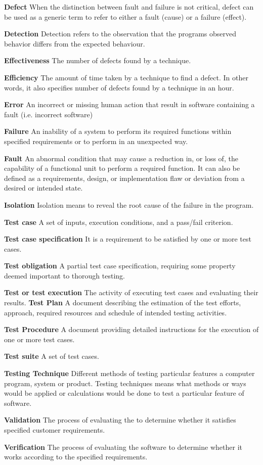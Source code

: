 \begin{glossary1}

\textbf{Defect} When the distinction between fault and failure is not critical, defect can be used as a generic term to refer to either a fault (cause) or a failure (effect).

\textbf{Detection} Detection refers to the observation that the programs observed behavior differs from the expected behaviour.

\textbf{Effectiveness} The number of defects found by a technique.

\textbf{Efficiency} The amount of time taken by a technique to find a defect. In other words, it also specifies number of defects found by a technique in an hour.

\textbf{Error} An incorrect or missing human action that result in software containing a fault (i.e. incorrect software)

\textbf{Failure} An inability of a system to perform its required functions within specified requirements or to perform in an unexpected way.

\textbf{Fault} An abnormal condition that may cause a reduction in, or loss of, the capability of a functional unit to perform a required function. It can also be defined as a requirements, design, or implementation flaw or deviation from a desired or intended state.

\textbf{Isolation} Isolation means to reveal the root cause of the failure in the program.

\textbf{Test case} A set of inputs, execution conditions, and a pass/fail criterion.

\textbf{Test case specification} It is a requirement to be satisfied by one or more test cases.

\textbf{Test obligation} A partial test case specification, requiring some property deemed important to thorough testing.

\textbf{Test or test execution} The activity of executing test cases and evaluating their results.
\textbf{Test Plan} A document describing the estimation of the test efforts, approach, required resources and schedule of intended testing activities.

\textbf{Test Procedure} A document providing detailed instructions for the execution of one or more test cases.

\textbf{Test suite} A set of test cases.

\textbf{Testing Technique} Different methods of testing particular features a computer program, system or product. Testing techniques means what methods or ways would be applied or calculations would be done to test a particular feature of software.

\textbf{Validation} The process of evaluating the to determine whether it satisfies specified customer requirements.

\textbf{Verification} The process of evaluating the software to determine whether it works according to the specified requirements.

\end{glossary1}